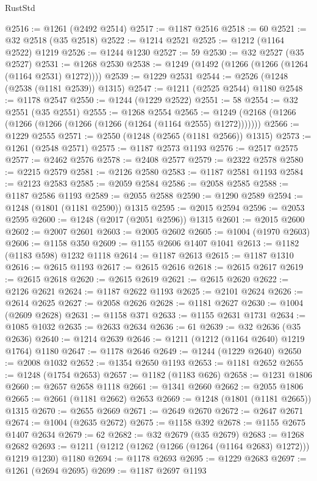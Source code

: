\begin{lexlean}{RustStd}
\begin{coremodule}
@2516 := @1261 (@2492 @2514)
@2517 := @1187 @2516
@2518 := 60
@2521 := @32 @2518 (@35 @2518)
@2522 := @1214 @2521
@2525 := @1212 (@1164 @2522) @1219
@2526 := @1244 @1230
@2527 := 59
@2530 := @32 @2527 (@35 @2527)
@2531 := @1268 @2530
@2538 := @1249 (@1492 (@1266 (@1266 (@1264 (@1164 @2531) @1272))))
@2539 := @1229 @2531
@2544 := @2526 (@1248 (@2538 (@1181 @2539)) @1315)
@2547 := @1211 (@2525 @2544) @1180
@2548 := @1178 @2547
@2550 := @1244 (@1229 @2522)
@2551 := 58
@2554 := @32 @2551 (@35 @2551)
@2555 := @1268 @2554
@2565 := @1249 (@2168 (@1266 (@1266 (@1266 (@1266 (@1266 (@1264 (@1164 @2555) @1272)))))))
@2566 := @1229 @2555
@2571 := @2550 (@1248 (@2565 (@1181 @2566)) @1315)
@2573 := @1261 (@2548 @2571)
@2575 := @1187 @2573 @1193
@2576 := @2517 @2575
@2577 := @2462 @2576
@2578 := @2408 @2577
@2579 := @2322 @2578
@2580 := @2215 @2579
@2581 := @2126 @2580
@2583 := @1187 @2581 @1193
@2584 := @2123 @2583
@2585 := @2059 @2584
@2586 := @2058 @2585
@2588 := @1187 @2586 @1193
@2589 := @2055 @2588
@2590 := @1290 @2589
@2594 := @1248 (@1801 (@1181 @2590)) @1315
@2595 := @2015 @2594
@2596 := @2053 @2595
@2600 := @1248 (@2017 (@2051 @2596)) @1315
@2601 := @2015 @2600
@2602 := @2007 @2601
@2603 := @2005 @2602
@2605 := @1004 (@1970 @2603)
@2606 := @1158 @350
@2609 := @1155 @2606 @1407 @1041
@2613 := @1182 (@1183 @598) @1232 @1118
@2614 := @1187 @2613
@2615 := @1187 @1310
@2616 := @2615 @1193
@2617 := @2615 @2616
@2618 := @2615 @2617
@2619 := @2615 @2618
@2620 := @2615 @2619
@2621 := @2615 @2620
@2622 := @2126 @2621
@2624 := @1187 @2622 @1193
@2625 := @2101 @2624
@2626 := @2614 @2625
@2627 := @2058 @2626
@2628 := @1181 @2627
@2630 := @1004 (@2609 @2628)
@2631 := @1158 @371
@2633 := @1155 @2631 @1731
@2634 := @1085 @1032
@2635 := @2633 @2634
@2636 := 61
@2639 := @32 @2636 (@35 @2636)
@2640 := @1214 @2639
@2646 := @1211 (@1212 (@1164 @2640) @1219 @1764) @1180
@2647 := @1178 @2646
@2649 := @1244 (@1229 @2640)
@2650 := @2008 @1032
@2652 := @1354 @2650 @1193
@2653 := @1181 @2652
@2655 := @1248 (@1754 @2653)
@2657 := @1182 (@1183 @626)
@2658 := @1231 @1806
@2660 := @2657 @2658 @1118
@2661 := @1341 @2660
@2662 := @2055 @1806
@2665 := @2661 (@1181 @2662) @2653
@2669 := @1248 (@1801 (@1181 @2665)) @1315
@2670 := @2655 @2669
@2671 := @2649 @2670
@2672 := @2647 @2671
@2674 := @1004 (@2635 @2672)
@2675 := @1158 @392
@2678 := @1155 @2675 @1407 @2634
@2679 := 62
@2682 := @32 @2679 (@35 @2679)
@2683 := @1268 @2682
@2693 := @1211 (@1212 (@1262 (@1266 (@1264 (@1164 @2683) @1272))) @1219 @1230) @1180
@2694 := @1178 @2693
@2695 := @1229 @2683
@2697 := @1261 (@2694 @2695)
@2699 := @1187 @2697 @1193

\end{coremodule}
\end{lexlean}
